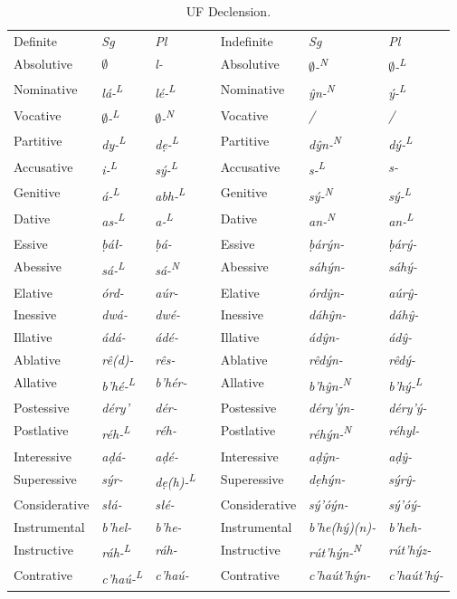 \documentclass[a4paper, 12pt, twoside, final]{article}
\let \nf \normalfont
\def \L {\textsuperscript{L}}
\def \N {\textsuperscript{N}}
\begin{document}
\begin{table}[H]
\centering
\noindent\begin{tabular}{l|>{\it}l|>{\it}lll|>{\it}l|>{\it}l}
Definite    &\nf Sg&\nf Pl && Indefinite       &\nf Sg&\nf Pl\\\cline{1-3}\cline{5-7}

Absolutive    & $\emptyset$     & l-       && Absolutive    & $\emptyset$-\N       & $\emptyset$-\L  \\
Nominative    & lá-\L   & lé-\L    && Nominative    & ŷn-\N        & ý-\L    \\
Vocative      & $\emptyset$-\L  & $\emptyset$-\N   && Vocative      & /            & /       \\
Partitive     & dy-\L   & dẹ-\L    && Partitive     & dŷn-\N       & dý-\L   \\
Accusative    & i-\L    & sý-\L    && Accusative    & s-\L         & s-      \\
Genitive      & á-\L    & abh-\L   && Genitive      & sý-\N        & sý-\L   \\
Dative        & as-\L   & a-\L     && Dative        & an-\N        & an-\L   \\
Essive        & ḅáł-    & ḅá-      && Essive        & ḅárýn-       & ḅárý-    \\
Abessive      & sá-\L   & sá-\N    && Abessive      & sáhýn-       & sáhý-    \\
Elative       & órd-    & aúr-     && Elative       & órdŷn-       & aúrŷ-    \\
Inessive      & dwá-    & dwé-     && Inessive      & dáhŷn-       & dáhŷ-    \\
Illative      & ádá-    & ádé-     && Illative      & ádŷn-        & ádŷ-     \\
Ablative      & rê(d)-  & rês-     && Ablative      & rêdýn-       & rêdý-    \\
Allative      & b’hé-\L & b’hér-   && Allative      & b’hŷn-\N     & b’hý-\L  \\
Postessive    & déry’   & dér-     && Postessive    & déry’ýn-     & déry’ý-  \\
Postlative    & réh-\L  & réh-     && Postlative    & réhýn-\N     & réhyl-   \\ %
Interessive   & aḍá-    & aḍé-     && Interessive   & aḍŷn-        & aḍŷ-     \\
Superessive   & sýr-    & dẹ(h)-\L && Superessive   & dẹhýn-       & sýrŷ-    \\
Considerative & słá-    & słé-     && Considerative & sý’óýn-      & sý’óý-   \\
Instrumental  & b’hel-  & b’he-    && Instrumental  & b’he(hý)(n)- & b’heh-   \\
Instructive   & ráh-\L   & ráh-    && Instructive   & rút’hýn-\N   & rút’hýz- \\
Contrative    & c’haú-\L & c’haú-  && Contrative    & c’haút’hýn-  & c’haút’hý- \\ %
\end{tabular}
\caption{UF Declension.}\label{tab:table-uf-declension}
\end{table}
\end{document}
